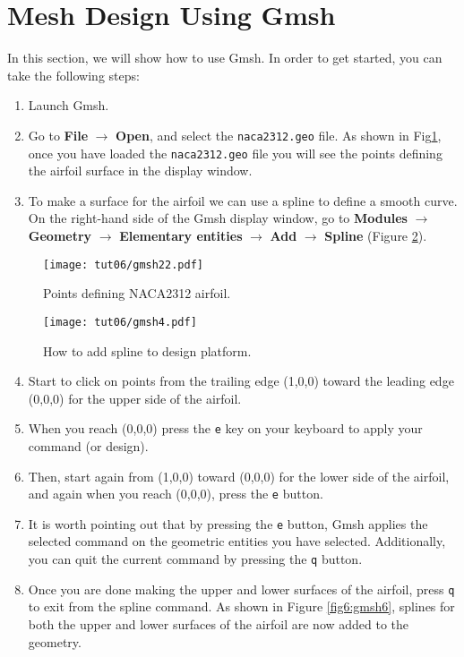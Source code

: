 \section*{Mesh Design Using Gmsh}
In this section, we will show how to use Gmsh. In order to get started, you can take the following steps:
\begin{enumerate}[label=\arabic*)]
	\setcounter{enumi}{0}
	\item Launch Gmsh.
	\item Go to \textbf{File} $\rightarrow$ \textbf{Open}, and select the \texttt{naca2312.geo} file. As shown in Fig\ref{fig6:gmsh22}, once you have loaded the \texttt{naca2312.geo} file you will see the points defining the airfoil surface in the display window.	
	\item To make a surface for the airfoil we can use a spline to define a smooth curve. On the right-hand side of the Gmsh display window, go to \textbf{Modules} $\rightarrow$ \textbf{Geometry} $\rightarrow$ \textbf{Elementary entities} $\rightarrow$ \textbf{Add} $\rightarrow$ \textbf{Spline} (Figure \ref{fig6:gmsh4}).
\end{enumerate}
\begin{figure}[ht]
    \centering
    \texttt{[image: tut06/gmsh22.pdf]}
    \caption{Points defining NACA2312 airfoil.}
    \label{fig6:gmsh22}
\end{figure}
\begin{figure}[ht]
    \centering
    \texttt{[image: tut06/gmsh4.pdf]}
    \caption{How to add spline to design platform.}
    \label{fig6:gmsh4}
\end{figure}
\begin{enumerate}[label=\arabic*)]
	\setcounter{enumi}{3}
	\item Start to click on points from the trailing edge (1,0,0) toward the leading edge (0,0,0) for the upper side of the airfoil.
	\item When you reach (0,0,0) press the \texttt{e} key on your keyboard to apply your command (or design).
	\item Then, start again from (1,0,0) toward (0,0,0) for the lower side of the airfoil, and again when you reach (0,0,0), press the \texttt{e} button.
	\item It is worth pointing out that by pressing the \texttt{e} button, Gmsh applies the selected command on the geometric entities you have selected. Additionally, you can quit the current command by pressing the \texttt{q} button.
	\item Once you are done making the upper and lower surfaces of the airfoil, press \texttt{q} to exit from the spline command. As shown in Figure \ref{fig6:gmsh6}, splines for both the upper and lower surfaces of the airfoil are now added to the geometry.	
\end{enumerate}
